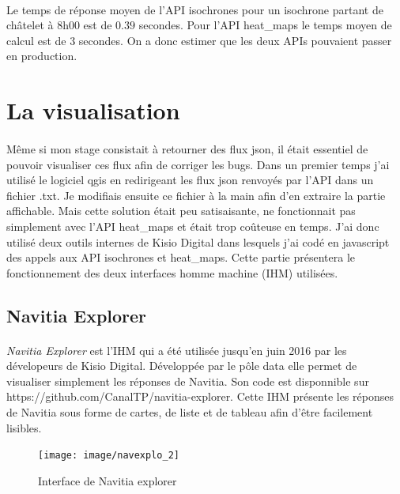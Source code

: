 \documentclass[a4paper]{report}
\begin{document}
\paragraph{} Le temps de réponse moyen de l'API isochrones pour un isochrone partant de châtelet à 8h00 est de $0.39$ secondes.  Pour l'API heat\_maps le temps moyen de calcul est de $3$ secondes. On a donc estimer que les deux APIs pouvaient passer en production.

\section{La visualisation}

\paragraph{} Même si mon stage consistait à retourner des flux json, il était essentiel de pouvoir visualiser ces flux afin de corriger les bugs. Dans un premier temps j'ai utilisé le logiciel qgis en redirigeant les flux json renvoyés par l'API dans un fichier .txt. Je modifiais ensuite ce fichier à la main afin d'en extraire la partie affichable. Mais cette solution était peu satisaisante, ne fonctionnait pas simplement avec l'API heat\_maps et était trop coûteuse en temps. J'ai donc utilisé deux outils internes de Kisio Digital dans lesquels j'ai codé en javascript des appels aux API isochrones et heat\_maps. Cette partie présentera le fonctionnement des deux interfaces homme machine (IHM) utilisées.

\subsection{Navitia Explorer}

\paragraph{} \emph{Navitia Explorer} est l'IHM qui a été utilisée jusqu'en juin 2016 par les dévelopeurs de Kisio Digital. Développée par le pôle data elle permet de visualiser simplement les réponses de Navitia. Son code est disponnible sur \color{blue} https://github.com/CanalTP/navitia-explorer\color{black}. Cette IHM présente les réponses de Navitia sous forme de cartes, de liste et de tableau afin d'être facilement lisibles.

\begin{figure}[H]
	\begin{center}
		\texttt{[image: image/navexplo\_2]}
		\caption{Interface de Navitia explorer}
		\label{Interface de Navitia explorer}
	\end{center}
\end{figure}
\end{document}
